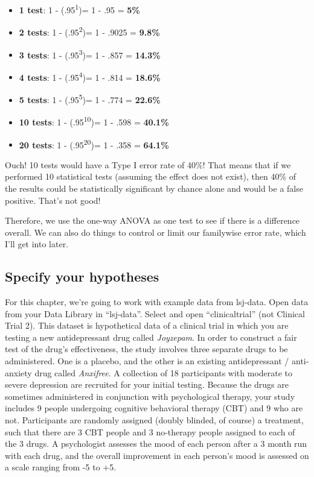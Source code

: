 \documentclass[
]{book}
\providecommand{\tightlist}{%
  \setlength{\itemsep}{0pt}\setlength{\parskip}{0pt}}
\begin{document}
\begin{itemize}
\tightlist
\item
  \textbf{1 test}: 1 - (.95\textsuperscript{1})= 1 - .95 = \textbf{5\%}
\item
  \textbf{2 tests}: 1 - (.95\textsuperscript{2})= 1 - .9025 = \textbf{9.8\%}
\item
  \textbf{3 tests}: 1 - (.95\textsuperscript{3})= 1 - .857 = \textbf{14.3\%}
\item
  \textbf{4 tests}: 1 - (.95\textsuperscript{4})= 1 - .814 = \textbf{18.6\%}
\item
  \textbf{5 tests}: 1 - (.95\textsuperscript{5})= 1 - .774 = \textbf{22.6\%}
\item
  \textbf{10 tests}: 1 - (.95\textsuperscript{10})= 1 - .598 = \textbf{40.1\%}
\item
  \textbf{20 tests}: 1 - (.95\textsuperscript{20})= 1 - .358 = \textbf{64.1\%}
\end{itemize}

Ouch! 10 tests would have a Type I error rate of 40\%! That means that if we performed 10 statistical tests (assuming the effect does not exist), then 40\% of the results could be statistically significant by chance alone and would be a false positive. That's not good!

Therefore, we use the one-way ANOVA as one test to see if there is a difference overall. We can also do things to control or limit our familywise error rate, which I'll get into later.

\hypertarget{specify-your-hypotheses-4}{%
\subsection{Specify your hypotheses}\label{specify-your-hypotheses-4}}

For this chapter, we're going to work with example data from lsj-data. Open data from your Data Library in ``lsj-data''. Select and open ``clinicaltrial'' (not Clinical Trial 2). This dataset is hypothetical data of a clinical trial in which you are testing a new antidepressant drug called \emph{Joyzepam}. In order to construct a fair test of the drug's effectiveness, the study involves three separate drugs to be administered. One is a placebo, and the other is an existing antidepressant / anti-anxiety drug called \emph{Anxifree}. A collection of 18 participants with moderate to severe depression are recruited for your initial testing. Because the drugs are sometimes administered in conjunction with psychological therapy, your study includes 9 people undergoing cognitive behavioral therapy (CBT) and 9 who are not. Participants are randomly assigned (doubly blinded, of course) a treatment, such that there are 3 CBT people and 3 no-therapy people assigned to each of the 3 drugs. A psychologist assesses the mood of each person after a 3 month run with each drug, and the overall improvement in each person's mood is assessed on a scale ranging from -5 to +5.
\end{document}
